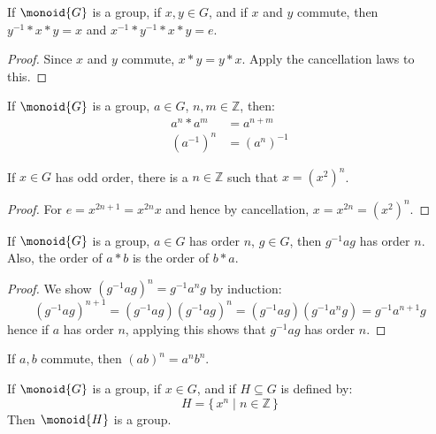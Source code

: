 \documentclass{article}                                                        %
\begin{document}
        \begin{theorem}
            If $\monoid{G}$ is a group, if $x,y\in{G}$, and if $x$ and $y$
            commute, then $y^{\minus{1}}*x*y=x$ and
            $x^{\minus{1}}*y^{\minus{1}}*x*y=e$.
        \end{theorem}
        \begin{proof}
            Since $x$ and $y$ commute, $x*y=y*x$. Apply the cancellation laws
            to this.
        \end{proof}
        \begin{theorem}
            If $\monoid{G}$ is a group, $a\in{G}$, $n,m\in\mathbb{Z}$, then:
            \begin{align}
                a^{n}*a^{m}&=a^{n+m}\\
                (a^{\minus{1}})^{n}&=(a^{n})^{\minus{1}}
            \end{align}
        \end{theorem}
        \begin{theorem}
            If $x\in{G}$ has odd order, there is a $n\in\mathbb{Z}$ such that
            $x=(x^{2})^{n}$.
        \end{theorem}
        \begin{proof}
            For $e=x^{2n+1}=x^{2n}x$ and hence by cancellation,
            $x=x^{2n}=(x^{2})^{n}$.
        \end{proof}
        \begin{theorem}
            If $\monoid{G}$ is a group, $a\in{G}$ has order $n$, $g\in{G}$,
            then $g^{\minus{1}}ag$ has order $n$. Also, the order of $a*b$ is
            the order of $b*a$.
        \end{theorem}
        \begin{proof}
            We show $(g^{\minus{1}}ag)^{n}=g^{\minus{1}}a^{n}g$ by induction:
            \begin{equation}
                (g^{\minus{1}}ag)^{n+1}=(g^{\minus{1}}ag)(g^{\minus{1}}ag)^{n}
                =(g^{\minus{1}}ag)(g^{\minus{1}}a^{n}g)
                =g^{\minus{1}}a^{n+1}g
            \end{equation}
            hence if $a$ has order $n$, applying this shows that
            $g^{\minus{1}}ag$ has order $n$.
        \end{proof}
        \begin{theorem}
            If $a,b$ commute, then $(ab)^{n}=a^{n}b^{n}$.
        \end{theorem}
        \begin{theorem}
            If $\monoid{G}$ is a group, if $x\in{G}$, and if $H\subseteq{G}$ is
            defined by:
            \begin{equation}
                H=\{\,x^{n}\;|\;n\in\mathbb{Z}\,\}
            \end{equation}
            Then $\monoid{H}$ is a group.
        \end{theorem}
\end{document}
